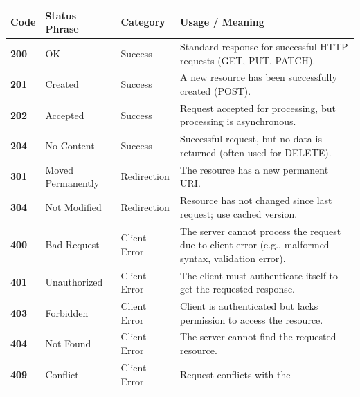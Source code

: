 \documentclass[
  11pt,
  openany,
  oneside]{book}
\begin{document}
\begin{longtable}[]{@{}
  >{\raggedright\arraybackslash}p{}
  >{\raggedright\arraybackslash}p{}
  >{\raggedright\arraybackslash}p{}
  >{\raggedright\arraybackslash}p{}@{}}
\toprule\noalign{}
\begin{minipage}[b]{\linewidth}\raggedright
Code
\end{minipage} & \begin{minipage}[b]{\linewidth}\raggedright
Status Phrase
\end{minipage} & \begin{minipage}[b]{\linewidth}\raggedright
Category
\end{minipage} & \begin{minipage}[b]{\linewidth}\raggedright
Usage / Meaning
\end{minipage} \\
\midrule\noalign{}
\endhead
\bottomrule\noalign{}
\endlastfoot
\textbf{200} & OK & Success & Standard response for successful HTTP
requests (GET, PUT, PATCH). \\
\textbf{201} & Created & Success & A new resource has been successfully
created (POST). \\
\textbf{202} & Accepted & Success & Request accepted for processing, but
processing is asynchronous. \\
\textbf{204} & No Content & Success & Successful request, but no data is
returned (often used for DELETE). \\
\textbf{301} & Moved Permanently & Redirection & The resource has a new
permanent URI. \\
\textbf{304} & Not Modified & Redirection & Resource has not changed
since last request; use cached version. \\
\textbf{400} & Bad Request & Client Error & The server cannot process
the request due to client error (e.g., malformed syntax, validation
error). \\
\textbf{401} & Unauthorized & Client Error & The client must
authenticate itself to get the requested response. \\
\textbf{403} & Forbidden & Client Error & Client is authenticated but
lacks permission to access the resource. \\
\textbf{404} & Not Found & Client Error & The server cannot find the
requested resource. \\
\textbf{409} & Conflict & Client Error & Request conflicts with the

\end{longtable}
\end{document}
